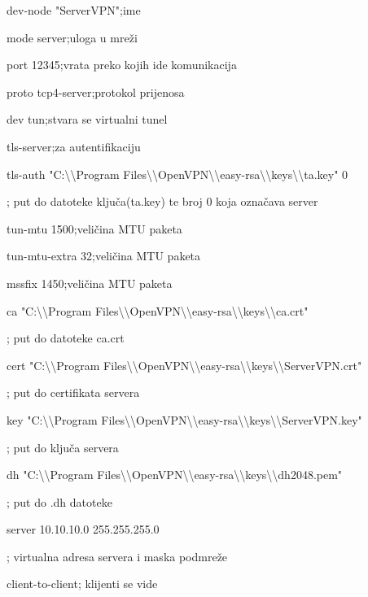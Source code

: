 {\small{}\selectfont
dev-node "ServerVPN"\hfill;ime

mode server\hfill;uloga u mreži

port 12345\hfill;vrata preko kojih ide komunikacija	

proto tcp4-server\hfill;protokol prijenosa

dev tun\hfill;stvara se virtualni tunel

tls-server\hfill;za autentifikaciju

tls-auth "C:\textbackslash \textbackslash Program Files\textbackslash \textbackslash OpenVPN\textbackslash \textbackslash easy-rsa\textbackslash \textbackslash keys\textbackslash \textbackslash ta.key" 0\hfill

; put do datoteke ključa(ta.key) te broj 0 koja označava server

tun-mtu 1500\hfill;veličina MTU paketa

tun-mtu-extra 32\hfill;veličina MTU paketa

mssfix 1450\hfill;veličina MTU paketa

ca "C:\textbackslash \textbackslash Program Files\textbackslash \textbackslash OpenVPN\textbackslash \textbackslash easy-rsa\textbackslash \textbackslash keys\textbackslash \textbackslash ca.crt"\hfill

; put do datoteke ca.crt

cert "C:\textbackslash \textbackslash Program Files\textbackslash \textbackslash OpenVPN\textbackslash \textbackslash easy-rsa\textbackslash \textbackslash keys\textbackslash \textbackslash ServerVPN.crt"\hfill

; put do certifikata servera

key "C:\textbackslash \textbackslash Program Files\textbackslash \textbackslash OpenVPN\textbackslash \textbackslash easy-rsa\textbackslash \textbackslash keys\textbackslash \textbackslash ServerVPN.key"\hfill

; put do ključa servera

dh "C:\textbackslash \textbackslash Program Files\textbackslash \textbackslash OpenVPN\textbackslash \textbackslash easy-rsa\textbackslash \textbackslash keys\textbackslash \textbackslash dh2048.pem"\hfill

; put do .dh datoteke

server 10.10.10.0 255.255.255.0\hfill

; virtualna adresa servera i maska podmreže

client-to-client\hfill; klijenti se vide

}
